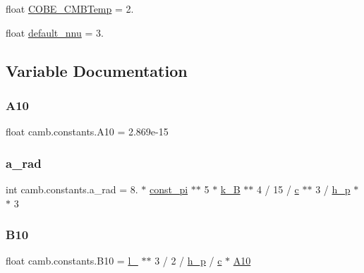 \begin{DoxyCompactItemize}
$$\item 
float \mbox{\hyperlink{namespacecamb_1_1constants_a021083fae909f391c578458f5ddafc75}{C\+O\+B\+E\+\_\+\+C\+M\+B\+Temp}} = 2.
\item 
float \mbox{\hyperlink{namespacecamb_1_1constants_ac0634b29947bf6b28e150de26a4e443d}{default\+\_\+nnu}} = 3.
\end{DoxyCompactItemize}


\subsection{Variable Documentation}
\mbox{\label{namespacecamb_1_1constants_a8b86eab84c8892fc5467fad7fc9445fb}} 
\subsubsection{\texorpdfstring{A10}{A10}}
{\footnotesize\ttfamily float camb.\+constants.\+A10 = 2.\+869e-\/15}

\mbox{\label{namespacecamb_1_1constants_a09428c5382962f64116178df09f92544}} 
\subsubsection{\texorpdfstring{a\+\_\+rad}{a\_rad}}
{\footnotesize\ttfamily int camb.\+constants.\+a\+\_\+rad = 8. $\ast$ \mbox{\hyperlink{namespacecamb_1_1constants_a1020ead9e0e4db6bc81ad82aa777cd28}{const\+\_\+pi}} $\ast$$\ast$ 5 $\ast$ \mbox{\hyperlink{namespacecamb_1_1constants_af524d81ee3b1617ff9509b924eae87cd}{k\+\_\+B}} $\ast$$\ast$ 4 / 15 / \mbox{\hyperlink{namespacecamb_1_1constants_a08e77640ea70d03f8c60ba9f7f2644b9}{c}} $\ast$$\ast$ 3 / \mbox{\hyperlink{namespacecamb_1_1constants_ab268b921161c6a8a467bda8f21df3d17}{h\+\_\+p}} $\ast$$\ast$ 3}

\mbox{\label{namespacecamb_1_1constants_ae398545ba8772f8bd8fad0bbe5902ae0}} 
\subsubsection{\texorpdfstring{B10}{B10}}
{\footnotesize\ttfamily float camb.\+constants.\+B10 = \mbox{\hyperlink{namespacecamb_1_1constants_adcf680f76dae0255ef99d7e87b0bd1ef}{l\+\_\+21cm}} $\ast$$\ast$ 3 / 2 / \mbox{\hyperlink{namespacecamb_1_1constants_ab268b921161c6a8a467bda8f21df3d17}{h\+\_\+p}} / \mbox{\hyperlink{namespacecamb_1_1constants_a08e77640ea70d03f8c60ba9f7f2644b9}{c}} $\ast$ \mbox{\hyperlink{namespacecamb_1_1constants_a8b86eab84c8892fc5467fad7fc9445fb}{A10}}}

